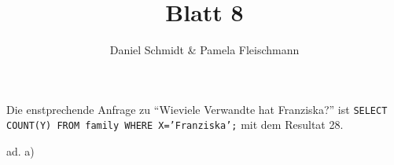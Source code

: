 \documentclass[12pt,a4paper]{amsart}
\begin{document}
\title{Blatt 8}

\author{Daniel Schmidt \& Pamela Fleischmann}

\maketitle

\begin{aufgabe1}


Die enstprechende Anfrage zu ``Wieviele Verwandte hat Franziska?'' ist \texttt{SELECT COUNT(Y) FROM family WHERE X='Franziska';} mit dem Resultat 28.
\end{aufgabe1}


\begin{aufgabe1}
ad. a)



\end{aufgabe1}

\begin{aufgabe1}
\end{aufgabe1}
\end{document}
